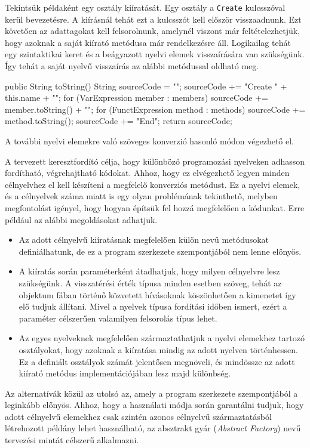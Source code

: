 Tekintsük példaként egy osztály kiíratását. Egy osztály a \texttt{Create} kulcsszóval kerül bevezetésre. A kiírásnál tehát ezt a kulcsszót kell először visszaadnunk. Ezt követően az adattagokat kell felsorolnunk, amelynél viszont már feltételezhetjük, hogy azoknak a saját kiírató metódusa már rendelkezésre áll. Logikailag tehát egy szintaktikai keret és a beágyazott nyelvi elemek visszaírására van szükségünk. Így tehát a saját nyelvű visszaírás az alábbi metódussal oldható meg.
\begin{java}
public String toString() {
    String sourceCode = "";
    sourceCode += "Create " + this.name + "\n";
    for (VarExpression member : members) {
        sourceCode += member.toString() + "\n";
    }
    for (FunctExpression method : methods) {
        sourceCode += method.toString();
    }
    sourceCode += "End\n";
    return sourceCode;
}
\end{java}
A további nyelvi elemekre való szöveges konverzió hasonló módon végezhető el.

A tervezett keresztfordító célja, hogy különböző programozási nyelveken adhasson fordítható, végrehajtható kódokat. Ahhoz, hogy ez elvégezhető legyen minden célnyelvhez el kell készíteni a megfelelő konverziós metódust. Ez a nyelvi elemek, és a célnyelvek száma miatt is egy olyan problémának tekinthető, melyben megfontolást igényel, hogy hogyan építsük fel hozzá megfelelően a kódunkat. Erre például az alábbi megoldásokat adhatjuk.
\begin{itemize}
\item Az adott célnyelvű kiíratásnak megfelelően külön nevű metódusokat definiálhatunk, de ez a program szerkezete szempontjából nem lenne előnyös.
\item A kiíratás során paraméterként átadhatjuk, hogy milyen célnyelvre lesz szükségünk. A visszatérési érték típusa minden esetben szöveg, tehát az objektum fában történő közvetett hívásoknak köszönhetően a kimenetet így elő tudjuk állítani. Mivel a nyelvek típusa fordítási időben ismert, ezért a paraméter célszerűen valamilyen felsorolás típus lehet.
\item Az egyes nyelveknek megfelelően származtathatjuk a nyelvi elemekhez tartozó osztályokat, hogy azoknak a kiíratása mindig az adott nyelven történhessen. Ez a definiált osztályok számát jelentősen megnöveli, és mindössze az adott kiírató metódus implementációjában lesz majd különbség.
\end{itemize}
Az alternatívák közül az utolsó az, amely a program szerkezete szempontjából a leginkább előnyös. Ahhoz, hogy a használati módja során garantálni tudjuk, hogy adott célnyelvű elemekhez csak szintén azonos célnyelvű származtatásból létrehozott példány lehet használható, az absztrakt gyár (\textit{Abstract Factory}) nevű tervezési mintát célszerű alkalmazni.
